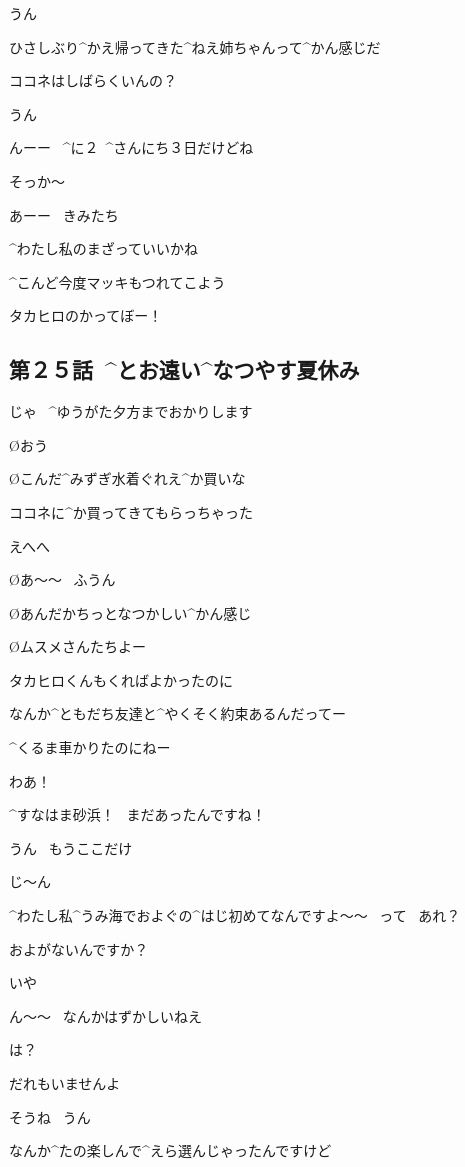 \T うん

\T ひさしぶり^{かえ}{帰}ってきた^{ねえ}{姉}ちゃんって^{かん}{感}じだ

\T ココネはしばらくいんの？

\K うん

\K んーー
\ ^{に}{２}\ ^{さんにち}{３日}だけどね

\T そっか〜

\A あーー
\ きみたち

\A ^{わたし}{私}のまざっていいかね

\page
\T ^{こんど}{今度}マッキもつれてこよう

\M タカヒロのかってぼー！


\subsection{第２５話\ ^{とお}{遠}い^{なつやす}{夏休}み}

\page[20]
\A じゃ
\ ^{ゆうがた}{夕方}までおかりします

\O おう

\page
\O こんだ^{みずぎ}{水着}ぐれえ^{か}{買}いな

\A ココネに^{か}{買}ってきてもらっちゃった

\A えへへ

\O あ〜〜
\ ふうん

\O あんだかちっとなつかしい^{かん}{感}じ

\O ムスメさんたちよー

\page
\K タカヒロくんもくればよかったのに

\A なんか^{ともだち}{友達}と^{やくそく}{約束}あるんだってー

\A ^{くるま}{車}かりたのにねー

\page
\K わあ！

\K ^{すなはま}{砂浜}！
\ まだあったんですね！

\A うん
\ もうここだけ

\page
\K じ〜ん

\K ^{わたし}{私}^{うみ}{海}でおよぐの^{はじ}{初}めてなんですよ〜〜
\ って
\ あれ？

\K およがないんですか？

\A いや

\A ん〜〜
\ なんかはずかしいねえ

\K は？

\K だれもいませんよ

\A そうね
\ うん

\page
\K なんか^{たの}{楽}しんで^{えら}{選}んじゃったんですけど

